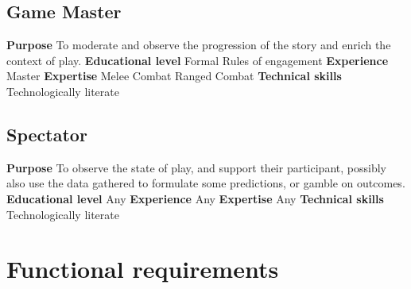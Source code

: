 \section{Game Master}
\textbf{Purpose}\newline
To moderate and observe the progression of the story and enrich the context of play.
\newline\newline
\textbf{Educational level} \newline
Formal Rules of engagement
\newline\newline
\textbf{Experience}\newline
Master
\newline\newline
\textbf{Expertise}\newline
Melee Combat
\newline
Ranged Combat
\newline\newline
\textbf{Technical skills}\newline
Technologically literate
\newline\newline

\section{Spectator}
\textbf{Purpose}\newline
To observe the state of play, and support their participant, possibly also use the data gathered to formulate some predictions, or gamble on outcomes.
\newline\newline
\textbf{Educational level} \newline
Any
\newline\newline
\textbf{Experience}\newline
Any
\newline\newline
\textbf{Expertise}\newline
Any
\newline\newline
\textbf{Technical skills}\newline
Technologically literate
\newline\newline


\chapter{Functional requirements}
\label{Functional requirements}
